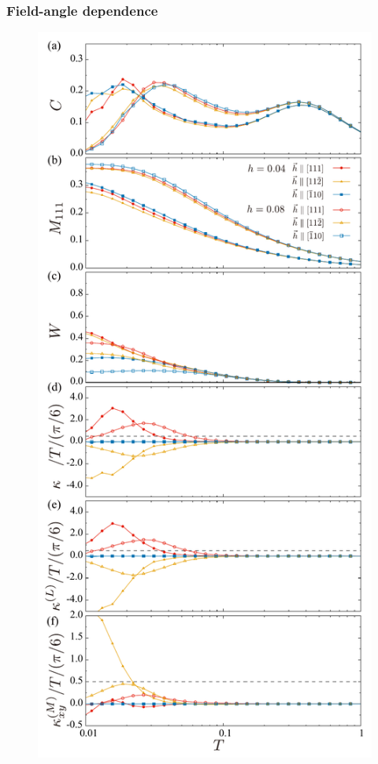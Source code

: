 \documentclass[twocolumn,superscriptaddress,showpacs, longbibliography, aps, prb]{revtex4-2}
\begin{document}
\subsubsection{Field-angle dependence}



\begin{figure}[htb]
  \begin{center}
    \includegraphics[width=0.9\linewidth]{Figs/plot_all_ab.pdf}

\end{center}
\end{figure}
\end{document}
